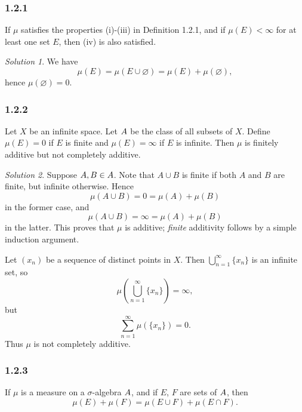 \documentclass{report}
\let\cal\relax
\newcommand{\cal}[1]{\mathcal{#1}}
\theoremstyle{remark}
\newtheorem*{solution}{Solution}
\begin{document}
\subsubsection*{1.2.1}
If $\mu$ satisfies the properties (i)-(iii) in Definition 1.2.1, and if $\mu(E) < \infty$ for at least one set $E$, then (iv) is also satisfied.

\begin{solution}
  We have
  \begin{equation*}
    \mu(E) = \mu(E \cup \varnothing) = \mu(E) + \mu(\varnothing),
  \end{equation*}
  hence $\mu(\varnothing) = 0$.
\end{solution}

\subsubsection*{1.2.2}
Let $X$ be an infinite space. Let $\cal A$ be the class of all subsets of $X$. Define $\mu(E) = 0$ if $E$ is finite and $\mu(E) = \infty$ if $E$ is infinite. Then $\mu$ is finitely additive but not completely additive.

\begin{solution}
  Suppose $A, B \in \cal A$. Note that $A \cup B$ is finite if both $A$ and $B$ are finite, but infinite otherwise. Hence
  \begin{equation*}
    \mu(A \cup B) = 0 = \mu(A) + \mu(B)
  \end{equation*}
  in the former case, and
  \begin{equation*}
    \mu(A \cup B) = \infty = \mu(A) + \mu(B)
  \end{equation*}
  in the latter. This proves that $\mu$ is additive; \emph{finite} additivity follows by a simple induction argument.

  Let $(x_n)$ be a sequence of distinct points in $X$. Then $\bigcup_{n=1}^\infty \{x_n\}$ is an infinite set, so
  \begin{equation*}
    \mu \left( \bigcup_{n=1}^\infty \{x_n\} \right) = \infty,
  \end{equation*}
  but
  \begin{equation*}
    \sum_{n=1}^\infty \mu(\{x_n\}) = 0.
  \end{equation*}
  Thus $\mu$ is not completely additive.
\end{solution}

\subsubsection*{1.2.3}
If $\mu$ is a measure on a $\sigma$-algebra $\cal A$, and if $E$, $F$ are sets of $\cal A$, then
\begin{equation*}
  \mu(E) + \mu(F) = \mu(E \cup F) + \mu(E \cap F).
\end{equation*}
\end{document}
